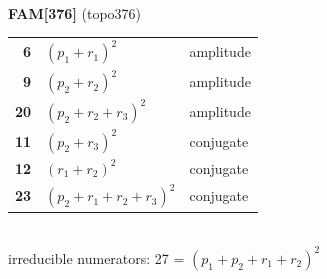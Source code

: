 \documentclass[10pt]{article}
\begin{document}
\begin{minipage}[t]{0.48\textwidth}
{}\\[2mm]\textbf{FAM[376]} (topo376)\\[2pt]{\footnotesize\begin{tabular}{@{}r@{\ \ }l@{\ \ }l@{}}\textbf{6} & $(p_1+r_1)^2$ & amplitude\\
\textbf{9} & $(p_2+r_2)^2$ & amplitude\\
\textbf{20} & $(p_2+r_2+r_3)^2$ & amplitude\\
\textbf{11} & $(p_2+r_3)^2$ & conjugate\\
\textbf{12} & $(r_1+r_2)^2$ & conjugate\\
\textbf{23} & $(p_2+r_1+r_2+r_3)^2$ & conjugate\\\end{tabular}}\\[2pt]{\scriptsize irreducible numerators: 27 = $(p_1+p_2+r_1+r_2)^2$}\end{minipage}\hfill%
\end{document}
